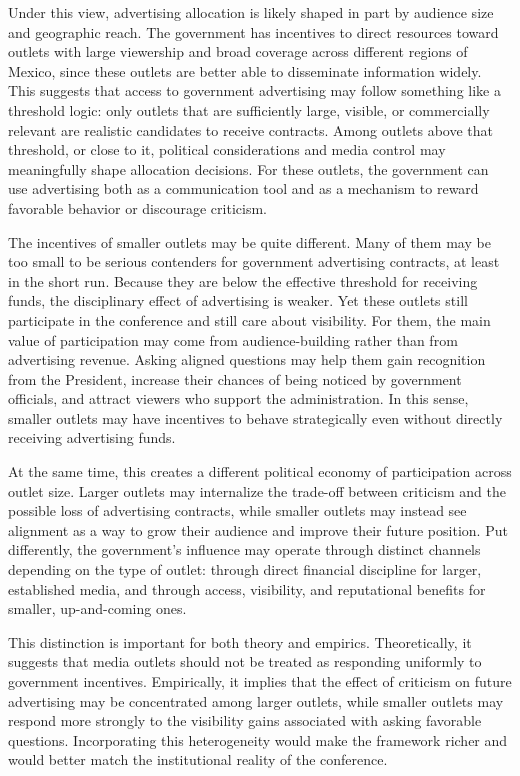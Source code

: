 \documentclass[12pt]{article}
\begin{document}
Under this view, advertising allocation is likely shaped in part by audience size and geographic reach. The government has incentives to direct resources toward outlets with large viewership and broad coverage across different regions of Mexico, since these outlets are better able to disseminate information widely. This suggests that access to government advertising may follow something like a threshold logic: only outlets that are sufficiently large, visible, or commercially relevant are realistic candidates to receive contracts. Among outlets above that threshold, or close to it, political considerations and media control may meaningfully shape allocation decisions. For these outlets, the government can use advertising both as a communication tool and as a mechanism to reward favorable behavior or discourage criticism.

The incentives of smaller outlets may be quite different. Many of them may be too small to be serious contenders for government advertising contracts, at least in the short run. Because they are below the effective threshold for receiving funds, the disciplinary effect of advertising is weaker. Yet these outlets still participate in the conference and still care about visibility. For them, the main value of participation may come from audience-building rather than from advertising revenue. Asking aligned questions may help them gain recognition from the President, increase their chances of being noticed by government officials, and attract viewers who support the administration. In this sense, smaller outlets may have incentives to behave strategically even without directly receiving advertising funds.

At the same time, this creates a different political economy of participation across outlet size. Larger outlets may internalize the trade-off between criticism and the possible loss of advertising contracts, while smaller outlets may instead see alignment as a way to grow their audience and improve their future position. Put differently, the government’s influence may operate through distinct channels depending on the type of outlet: through direct financial discipline for larger, established media, and through access, visibility, and reputational benefits for smaller, up-and-coming ones.

This distinction is important for both theory and empirics. Theoretically, it suggests that media outlets should not be treated as responding uniformly to government incentives. Empirically, it implies that the effect of criticism on future advertising may be concentrated among larger outlets, while smaller outlets may respond more strongly to the visibility gains associated with asking favorable questions. Incorporating this heterogeneity would make the framework richer and would better match the institutional reality of the conference.
\end{document}
